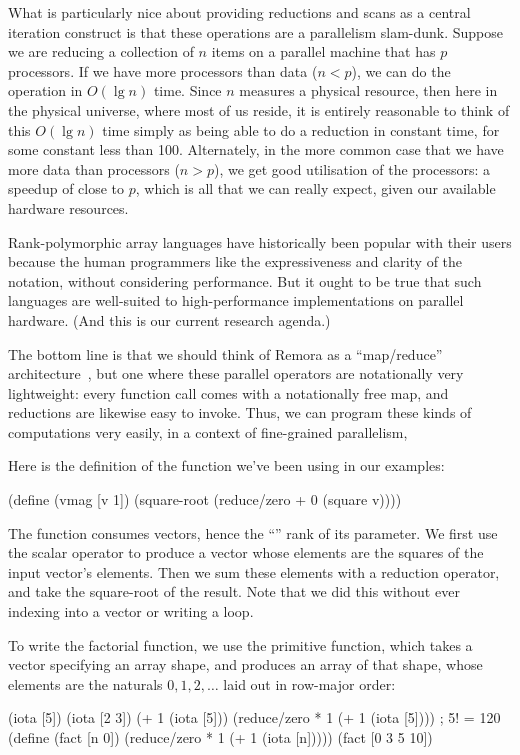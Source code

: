 What is particularly nice about providing reductions and scans as a
central iteration construct is that these operations are a parallelism
slam-dunk.
Suppose we are reducing a collection of $n$ items on a parallel
machine that has $p$ processors.
If we have more processors than data ($n < p$), we can do the operation
in $O(\lg n)$ time.
Since $n$ measures a physical resource,
then here in the physical universe, where most of us reside,
it is entirely reasonable to think of this $O(\lg n)$ time simply as
being able to do a reduction in constant time, for some constant less than 100.
Alternately, in the more common case
that we have more data than processors ($n > p$),
we get good utilisation of the processors:
a speedup of close to $p$, which is all that we can really expect,
given our available hardware resources.

Rank-polymorphic array languages have historically been popular with their
users because the human programmers like the expressiveness and clarity of the
notation, without considering performance.
But it ought to be true that such languages are well-suited to
high-performance implementations on parallel hardware.
(And this is our current research agenda.)

The bottom line is that we should think of Remora as a ``map/reduce''
architecture~\cite{Dean:mapreduce}, 
but one where these parallel operators are notationally
very light\-weight:
every function call comes with a notationally free map,
and reductions are likewise easy to invoke.
Thus, we can program these kinds of computations very easily,
in a context of fine-grained parallelism, 


Here is the definition of the  function we've
been using in our examples:
\begin{code}
(define (vmag [v 1])
  (square-root (reduce/zero + 0 (square v))))\end{code}
The function consumes vectors,
hence the ``'' rank of its  parameter.
We first use the scalar  operator to 
produce a vector whose
elements are the squares of the input vector's elements.
Then we sum these elements with a reduction operator,
and take the square-root of the result.
Note that we did this without ever indexing into a vector or writing a loop.

To write the factorial function, we use the primitive  function,
which takes a vector specifying an array shape, and produces
an array of that shape, whose elements are the naturals $0, 1, 2, \ldots$
laid out in row-major order:
\begin{code}
    (iota [5])
\result{[0 1 2 3 4]}
    (iota [2 3])
\result{[[0 1 2]
 [3 4 5]]}
    (+ 1 (iota [5]))
\result{[1 2 3 4 5]}
    (reduce/zero * 1 (+ 1 (iota [5])))  ; 5! = 120
    (define (fact [n 0])\label{example:factorial}
      (reduce/zero * 1 (+ 1 (iota [n]))))
    (fact [0 3 5 10])
\result{[1 6 120 3628800]}\end{code}

